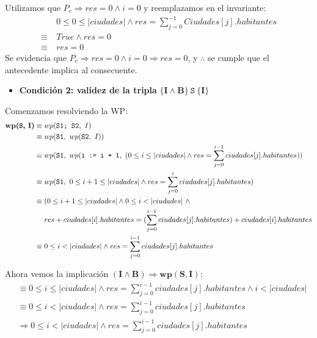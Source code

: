 \documentclass[10pt,a4paper]{article}
\begin{document}
Utilizamos que $P_c \Rightarrow res = 0 \land i = 0$ y reemplazamos en el invariante:
        \begin{equation*}
            \begin{split}
                & \ 0 \leq 0 \leq |ciudades| \land res = \sum\limits_{j = 0} ^ {-1}Ciudades[j].habitantes \\
                \equiv & \ True \land res = 0 \\
                \equiv & \ res = 0
            \end{split}
        \end{equation*}
Se evidencia que $P_c \Rightarrow res = 0 \land i = 0 \Rightarrow res = 0$, y $\therefore$ se cumple que el antecedente implica al consecuente. \\


\begin{itemize}
    \item{\textbf{Condición 2: validez de la tripla} $\mathbf{\{I \land B\} \ \texttt{S} \ \{I\}}$}
\end{itemize}

Comenzamos resolviendo la WP:
    \setcounter{equation}{0}
        \begin{align}
                \textbf{wp(\texttt{S}, I)} &\equiv wp(\texttt{S1; S2}, \ I) \\
                &\equiv wp(\texttt{S1}, \ wp(\texttt{S2}, \ I)) \\
                &\equiv wp(\texttt{S1}, \ wp(\texttt{i := i + 1}, \ (0 \leq i \leq |ciudades| \land res = \sum\limits_{j = 0}^{i - 1} ciudades[j].habitantes)) \\
                &\equiv wp(\texttt{S1}, \ 0 \leq i + 1 \leq |ciudades| \land res = \sum\limits_{j = 0}^{i} ciudades[j].habitantes) \\
                &\equiv (0 \leq i + 1 \leq |ciudades| \land 0\leq i < |ciudades| \ \land \\
                & \ \ \ \ res + ciudades[i].habitantes = (\sum\limits_{j = 0}^{i - 1} ciudades[j].habitantes) + ciudades[i].habitantes \\
                &\equiv 0 \leq i < |ciudades| \land res = \sum\limits_{j = 0}^{i - 1} ciudades[j].habitantes
        \end{align}

Ahora vemos la implicación $\mathbf{(I\land B) \Rightarrow wp(\textbf{S},I)}$:
    \setcounter{equation}{0}
    \begin{align}
               & \equiv 0 \leq i \leq |ciudades| \land res = \sum\limits_{j = 0} ^ {i - 1} ciudades[j].habitantes \land i < |ciudades| \\
               & \equiv 0 \leq i < |ciudades| \land res = \sum\limits_{j = 0} ^ {i - 1} ciudades[j].habitantes \\
               \nonumber & \Rightarrow 0 \leq i < |ciudades| \land res =\sum\limits_{j=0} ^ {i-1} ciudades[j].habitantes 
    \end{align}
\end{document}
